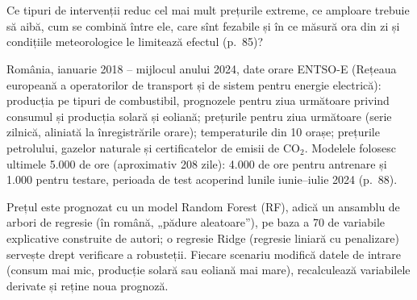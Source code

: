 \section{}
\textbf{} %
{Ce tipuri de intervenții reduc cel mai mult prețurile extreme, ce amploare trebuie să aibă, cum se combină între ele, care sînt fezabile și în ce măsură ora din zi și condițiile meteorologice le limitează efectul (p.~85)?}

\textbf{} %
{România, ianuarie 2018 -- mijlocul anului 2024, date orare ENTSO-E (Rețeaua europeană a operatorilor de transport și de sistem pentru energie electrică): producția pe tipuri de combustibil, prognozele pentru ziua următoare privind consumul și producția solară și eoliană;
prețurile pentru ziua următoare (serie zilnică, aliniată la înregistrările orare); temperaturile din 10 orașe; prețurile petrolului, gazelor naturale și certificatelor de emisii de CO$_2$. Modelele folosesc ultimele 5.000 de ore (aproximativ 208 zile):
4.000 de ore pentru antrenare și 1.000 pentru testare, perioada de test acoperind lunile iunie--iulie 2024 (p.~88).}

\textbf{} %
{Prețul este prognozat cu un model Random Forest (RF), adică un ansamblu de arbori de regresie (în română, „pădure aleatoare”), pe baza a 70 de variabile explicative construite de autori; o regresie Ridge (regresie liniară cu penalizare) servește drept verificare a robusteții.
Fiecare scenariu modifică datele de intrare (consum mai mic, producție solară sau eoliană mai mare), recalculează variabilele derivate și reține noua prognoză.}


